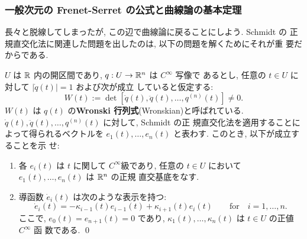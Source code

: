 \documentclass[12pt,twoside]{jarticle}
\begin{document}

\subsubsection{一般次元の Frenet-Serret の公式と曲線論の基本定理}

長々と脱線してしまったが, この辺で曲線論に戻ることにしよう. Schmidt の
正規直交化法に関連した問題を出したのは, 以下の問題を解くためにそれが重
要だからである.

\begin{question}
  $U$ は ${\mathbb R}$ 内の開区間であり, $q : U \to {\mathbb R}^n$ は $C^\infty$ 写像で
  あるとし, 任意の $t\in U$ に対して $|\dot{q}(t)| = 1$ および次が成立
  していると仮定する:
  \[
    W(t) := 
    \det[\dot{q}(t), \ddot{q}(t), \ldots, q^{(n)}(t)]
    \ne 0.
  \]%
  $W(t)$ は $q(t)$ の{\bf Wronski 行列式}(Wronskian)と呼ばれている. %
  $\dot{q}(t), \ddot{q}(t), \dots, q^{(n)}(t)$ に対して, Schmidt の正
  規直交化法を適用することによって得られるベクトルを %
  $e_1(t), \ldots, e_n(t)$ と表わす. このとき, 以下が成立することを示
  せ:
  \begin{enumerate}
  \item 各 $e_i(t)$ は $t$ に関して $C^\infty$級であり, %
    任意の $t\in U$ において $e_1(t), \dots, e_n(t)$ は ${\mathbb R}^n$ の正規
    直交基底をなす.
  \item 導函数 $\dot{e}_i(t)$ は次のような表示を持つ:
    \[
      \dot{e}_i(t)
      = - \kappa_{i-1}(t) e_{i-1}(t) + \kappa_{i+1}(t)e_i(t)
      \qquad\text{for}\quad
      i = 1, \dots, n.
    \]
    ここで, $e_0(t) = e_{n+1}(t) = 0$ であり, %
    $\kappa_1(t), \dots, \kappa_n(t)$ は $t\in U$ の正値 $C^\infty$ 函
    数である. \qed
  \end{enumerate}
\end{question}
\end{document}

